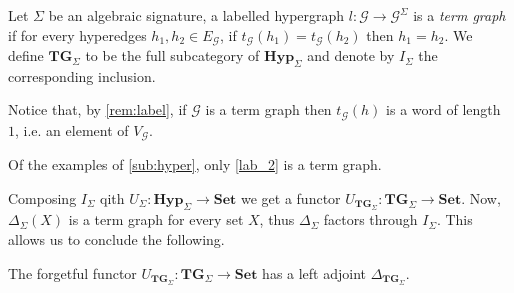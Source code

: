 \documentclass[runningheads,envcountsect]{lmcs}
\newcommand{\hyp}{\catname{Hyp}}
\newcommand{\catname}[1]{\mathbf{#1}}
\newcommand{\tg}[0]{\catname{TG}_{\Sigma}}
\theoremstyle{plain}
\theoremstyle{definition}
\begin{document}
\begin{defi}
Let $\Sigma$ be an algebraic signature, a labelled hypergraph $l:\mathcal{G}\to \mathcal{G}^{\Sigma}$ is a \emph{term graph} if for every hyperedges $h_1, h_2\in E_{\mathcal{G}}$, if $t_{\mathcal{G}}(h_1)=t_\mathcal{G}(h_2)$ then $h_1=h_2$. We define $\tg$ to be the full subcategory of $\hyp_{\Sigma}$ and denote by $I_\Sigma$ the corresponding inclusion.
\end{defi}

\begin{rem}Notice that, by \cref{rem:label}, if $\mathcal{G}$ is a term graph then $t_{\mathcal{G}}(h)$ is a word of length $1$, i.e. an element of $V_{\mathcal{G}}$. 
\end{rem}

\begin{exa}Of the examples of \cref{sub:hyper}, only \cref{lab_2} is a term graph.
\end{exa}

 Composing $I_\Sigma$ qith $U_\Sigma:\hyp_{\Sigma}\to \catname{Set}$ we get a functor $U_{\tg}:\tg\to \catname{Set}$. Now, $\Delta_{\Sigma}(X)$ is a term graph for every set $X$, thus $\Delta_{\Sigma}$ factors through $I_\Sigma$. This allows us to conclude the following.
\begin{prop}\label{term:left}The forgetful functor $U_{\tg}:\tg\to \catname{Set}$ has a left adjoint $\Delta_{\tg}$.
 \end{prop}
\end{document}
